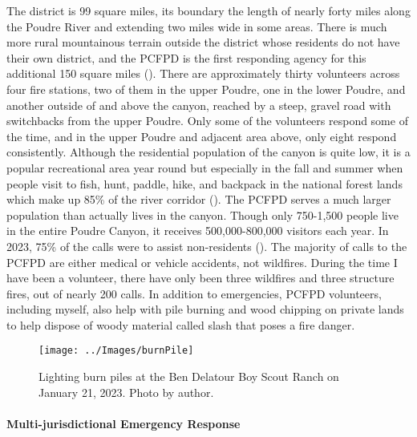 \documentclass[
]{article}
\begin{document}
The district is 99 square miles, its boundary the length of nearly forty miles along the Poudre River and extending two miles wide in some areas. There is much more rural mountainous terrain outside the district whose residents do not have their own district, and the PCFPD is the first responding agency for this additional 150 square miles (). There are approximately thirty volunteers across four fire stations, two of them in the upper Poudre, one in the lower Poudre, and another outside of and above the canyon, reached by a steep, gravel road with switchbacks from the upper Poudre. Only some of the volunteers respond some of the time, and in the upper Poudre and adjacent area above, only eight respond consistently. Although the residential population of the canyon is quite low, it is a popular recreational area year round but especially in the fall and summer when people visit to fish, hunt, paddle, hike, and backpack in the national forest lands which make up 85\% of the river corridor (). The PCFPD serves a much larger population than actually lives in the canyon. Though only 750-1,500 people live in the entire Poudre Canyon, it receives 500,000-800,000 visitors each year. In 2023, 75\% of the calls were to assist non-residents (). The majority of calls to the PCFPD are either medical or vehicle accidents, not wildfires. During the time I have been a volunteer, there have only been three wildfires and three structure fires, out of nearly 200 calls. In addition to emergencies, PCFPD volunteers, including myself, also help with pile burning and wood chipping on private lands to help dispose of woody material called slash that poses a fire danger.

\begin{figure}
\texttt{[image: ../Images/burnPile]} \caption[Burn piles]{Lighting burn piles at the Ben Delatour Boy Scout Ranch on January 21, 2023. Photo by author.}\label{fig:figureTitle-28}
\end{figure}

\paragraph{Multi-jurisdictional Emergency Response}\label{multi-jurisdictional-emergency-response}
\end{document}

